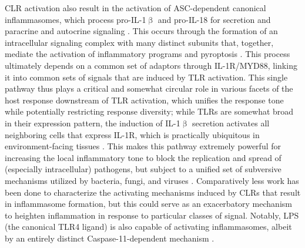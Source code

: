 CLR activation also result in the activation of ASC\hyp{}dependent canonical inflammasomes, which process pro\hyp{}IL\hyp{}1$\upbeta$ and pro\hyp{}IL\hyp{}18 for secretion and paracrine and autocrine signaling \citep{Gross2011}. This occurs through the formation of an intracellular signaling complex with many distinct subunits that, together, mediate the activation of inflammatory programs and pyroptosis \citep{Pandey2021}. This process ultimately depends on a common set of adaptors through IL\hyp{}1R/MYD88, linking it into common sets of signals that are induced by TLR activation. This single pathway thus plays a critical and somewhat circular role in various facets of the host response downstream of TLR activation, which unifies the response tone while potentially restricting response diversity; while TLRs are somewhat broad in their expression pattern, the induction of IL\hyp{}1$\upbeta$ secretion activates all neighboring cells that express IL\hyp{}1R, which is practically ubiquitous in environment\hyp{}facing tissues \citep{Deyerle1992, Malik2018}. This makes this pathway extremely powerful for increasing the local inflammatory tone to block the replication and spread of (especially intracellular) pathogens, but subject to a unified set of subversive mechanisms utilized by bacteria, fungi, and viruses \citep{Wein2022, MacMicking2012, Poeck2010, Tavares2015}. Comparatively less work has been done to characterize the activating mechanisms induced by CLRs that result in inflammasome formation, but this could serve as an exacerbatory mechanism to heighten inflammation in response to particular classes of signal. Notably, LPS (the canonical TLR4 ligand) is also capable of activating inflammasomes, albeit by an entirely distinct Caspase\hyp{}11\hyp{}dependent mechanism \citep{Hagar2013, Vanaja2016, Pilla2014, Finethy2020}.

